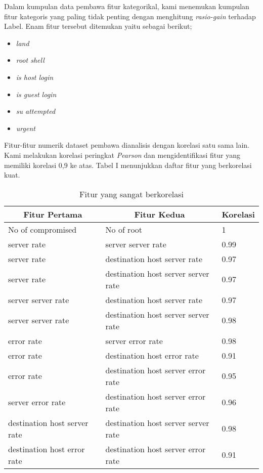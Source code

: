 \documentclass[conference]{IEEEtran}
\begin{document}
Dalam kumpulan data pembawa fitur kategorikal, kami menemukan kumpulan fitur kategoris yang paling tidak penting dengan menghitung \emph{rasio-gain} terhadap Label. Enam fitur tersebut ditemukan yaitu sebagai berikut;

\begin{itemize}
    \item \emph{land}
    \item \emph{root shell}
    \item \emph{is host login}
    \item \emph{is guest login}
    \item \emph{su attempted}
    \item \emph{urgent}
\end{itemize}

Fitur-fitur numerik dataset pembawa dianalisis dengan korelasi satu sama lain. Kami melakukan korelasi peringkat \emph{Pearson} dan mengidentifikasi fitur yang memiliki korelasi 0,9 ke atas. Tabel I menunjukkan daftar fitur yang berkorelasi kuat.

\begin{table}[htbp]
    \caption{Fitur yang sangat berkorelasi}
    \begin{center}
    \begin{tabular}{l|l|l}
    \hline
    \multicolumn{1}{c|}{\textbf{Fitur Pertama}}&\multicolumn{1}{c|}{\textbf{Fitur Kedua}}&\multicolumn{1}{c}{\textbf{Korelasi}} \\
    \hline
    No of compromised& No of root& 1\\
    \hline
    server rate& server server rate& 0.99\\
    \hline
    server rate& destination host server rate& 0.97\\
    \hline
    server rate& destination host server server rate& 0.97\\
    \hline
    server server rate& destination host server rate& 0.97\\
    \hline
    server server rate& destination host server server rate& 0.98\\
    \hline
    error rate& server error rate& 0.98\\
    \hline
    error rate& destination host error rate& 0.91\\
    \hline
    error rate& destination host server error rate& 0.95\\
    \hline
    server error rate& destination host server error rate& 0.96\\
    \hline
    destination host server rate& destination host server server rate& 0.98\\
    \hline
    destination host error rate& destination host server error rate& 0.91\\
    \hline
    \end{tabular}
    \label{tab1}
    \end{center}
\end{table}
\end{document}
